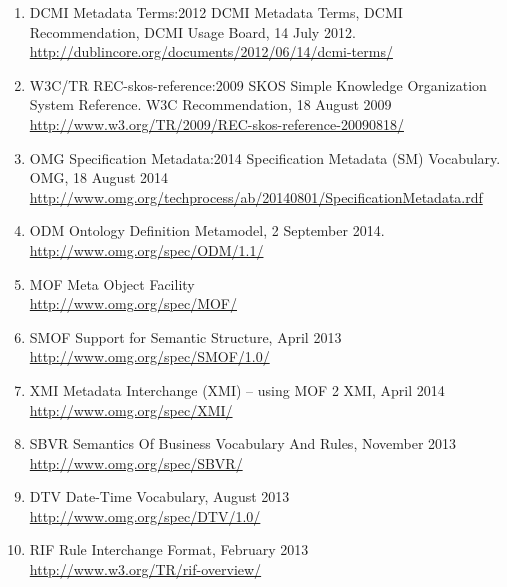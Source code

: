 \documentclass[10pt,fleqn,final]{scrreprt}
\providecommand{\DIFaddbegin}{} %
\providecommand{\DIFaddend}{} %
\providecommand{\DIFdelbegin}{} %
\providecommand{\DIFdelend}{} %
\begin{document}
\begin{enumerate}[label=\bfseries NR\arabic*]
  \DIFaddend \item{DCMI Metadata Terms:2012} {DCMI Metadata Terms, DCMI Recommendation, DCMI Usage Board, 14 July 2012.\\
     \url{http://dublincore.org/documents/2012/06/14/dcmi-terms/}}\DIFaddbegin \label{nref-DCMI}
  \DIFaddend \item{W3C/TR REC-skos-reference:2009} {SKOS Simple Knowledge Organization System
Reference.  W3C Recommendation, 18 August 2009\\ \url{http://www.w3.org/TR/2009/REC-skos-reference-20090818/}}\DIFaddbegin \label{nref-SKOS}
  \DIFaddend \item{OMG Specification Metadata:2014} {Specification Metadata (SM) Vocabulary.  OMG, 18 August 2014\\
\DIFdelbegin %
\DIFdelend \DIFaddbegin \url{http://www.omg.org/techprocess/ab/20140801/SpecificationMetadata.rdf}\DIFaddend }\DIFdelbegin %

\DIFdelend \DIFaddbegin \label{nref-OMG-SM}
  \DIFaddend \item{ODM} {Ontology Definition Metamodel, 2 September 2014. \\ \url{http://www.omg.org/spec/ODM/1.1/}}\DIFaddbegin \label{nref-ODM}
\DIFaddend \item{MOF} { Meta Object Facility} \\ \DIFdelbegin %
\DIFdelend \DIFaddbegin \url{http://www.omg.org/spec/MOF/}\label{nref-MOF}
\DIFaddend \item{SMOF} { Support for Semantic Structure, April 2013} \\ \url{http://www.omg.org/spec/SMOF/1.0/}\DIFaddbegin \label{nref-SMOF}
\DIFaddend \item{XMI} {Metadata Interchange (XMI) – using MOF 2 XMI, April 2014} \\ \DIFdelbegin %
\DIFdelend \DIFaddbegin \url{http://www.omg.org/spec/XMI/}\label{nref-XMI}
\DIFaddend %
\item{SBVR} {Semantics Of Business Vocabulary And Rules, November 2013} \\ \url{http://www.omg.org/spec/SBVR/}\DIFaddbegin \label{nref-SBVR}
\DIFaddend \item{DTV} {Date-Time Vocabulary, August 2013} \\ \url{http://www.omg.org/spec/DTV/1.0/}\DIFaddbegin \label{nref-DTV}
\DIFaddend \item{RIF} {Rule Interchange Format, February 2013} \\ \url{http://www.w3.org/TR/rif-overview/}\DIFaddbegin \label{nref-RIF}
\DIFaddend \end{enumerate}
\end{document}

